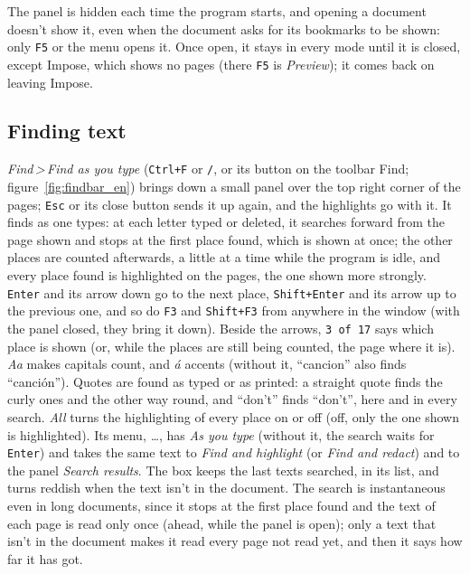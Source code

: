 \documentclass[12pt,
              article,
              oneside
              ]{memoir}
\newcommand*{\menu}[1]{\textit{#1}}
\newcommand*{\then}{\,>\,}
\newcommand*{\key}[1]{\texttt{#1}}
\begin{document}
The panel is hidden each time the program starts, and opening a document
doesn't show it, even when the document asks for its bookmarks to be
shown: only \key{F5} or the menu opens it. Once open, it stays in every
mode until it is closed, except Impose, which shows no pages (there
\key{F5} is \menu{Preview}); it comes back on leaving Impose.

\subsection{Finding text}

%
%
\menu{Find\then Find as you type} (\key{Ctrl+F} or \key{/}, or its button
on the toolbar Find; figure~\ref{fig:findbar_en}) brings down a small
panel over the top right corner of the pages; \key{Esc} or its close
button sends it up again, and the highlights go with it. It finds as one
types: at each letter typed or deleted, it searches forward from the page
shown and stops at the first place found, which is shown at once; the
other places are counted afterwards, a little at a time while the program
is idle, and every place found is highlighted on the pages, the one shown
more strongly. \key{Enter} and its arrow down go to the next place,
\key{Shift+Enter} and its arrow up to the previous one, and so do \key{F3}
and \key{Shift+F3} from anywhere in the window (with the panel closed, they
bring it down). Beside the arrows, \texttt{3 of 17} says which place is
shown (or, while the places are still being counted, the page where it
is). \menu{Aa} makes capitals count, and \menu{á} accents (without it,
\enquote{cancion} also finds \enquote{canción}). Quotes are found as
typed or as printed: a straight quote finds the curly ones and the other
way round, and \enquote{don't} finds \enquote{don’t}, here and in every
search. \menu{All} turns the
highlighting of every place on or off (off, only the one shown is
highlighted). Its menu, \menu{\dots}, has \menu{As you type} (without it,
the search waits for \key{Enter}) and takes the same text to \menu{Find
and highlight} (or \menu{Find and redact}) and to the panel \menu{Search
results}. The box keeps the last texts searched, in its list, and turns
reddish when the text isn't in the document. The search is instantaneous
even in long documents, since it stops at the first place found and the
text of each page is read only once (ahead, while the panel is open); only
a text that isn't in the document makes it read every page not read yet,
and then it says how far it has got.
\end{document}
